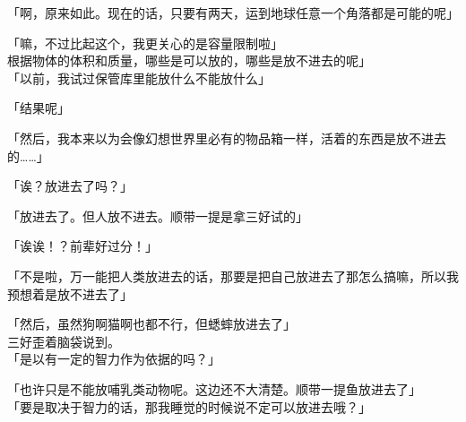 「啊，原来如此。现在的话，只要有两天，运到地球任意一个角落都是可能的呢」

「嘛，不过比起这个，我更关心的是容量限制啦」\\

根据物体的体积和质量，哪些是可以放的，哪些是放不进去的呢」\\

「以前，我试过保管库里能放什么不能放什么」

「结果呢」

「然后，我本来以为会像幻想世界里必有的物品箱一样，活着的东西是放不进去的……」

「诶？放进去了吗？」

「放进去了。但人放不进去。顺带一提是拿三好试的」

「诶诶！？前辈好过分！」

「不是啦，万一能把人类放进去的话，那要是把自己放进去了那怎么搞嘛，所以我预想着是放不进去了」

「然后，虽然狗啊猫啊也都不行，但蟋蟀放进去了」\\

三好歪着脑袋说到。\\

「是以有一定的智力作为依据的吗？」

「也许只是不能放哺乳类动物呢。这边还不大清楚。顺带一提鱼放进去了」\\

「要是取决于智力的话，那我睡觉的时候说不定可以放进去哦？」

